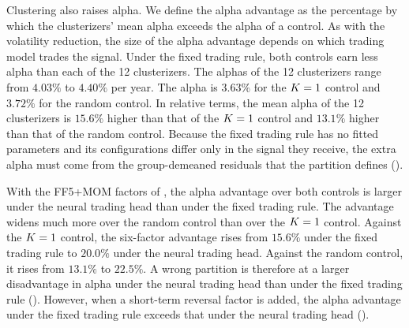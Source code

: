 

Clustering also raises alpha. We define the alpha advantage as the percentage by which the clusterizers' mean alpha exceeds the alpha of a control. As with the volatility reduction, the size of the alpha advantage depends on which trading model trades the signal. Under the fixed trading rule, both controls earn less alpha than each of the 12 clusterizers. The alphas of the 12 clusterizers range from $4.03\%$ to $4.40\%$ per year. The alpha is $3.63\%$ for the $K=1$ control and $3.72\%$ for the random control. In relative terms, the mean alpha of the 12 clusterizers is $15.6\%$ higher than that of the $K=1$ control and $13.1\%$ higher than that of the random control. Because the fixed trading rule has no fitted parameters and its configurations differ only in the signal they receive, the extra alpha must come from the group-demeaned residuals that the partition defines ().

With the FF5+MOM factors of , the alpha advantage over both controls is larger under the neural trading head than under the fixed trading rule. The advantage widens much more over the random control than over the $K=1$ control. Against the $K=1$ control, the six-factor advantage rises from $15.6\%$ under the fixed trading rule to $20.0\%$ under the neural trading head. Against the random control, it rises from $13.1\%$ to $22.5\%$. A wrong partition is therefore at a larger disadvantage in alpha under the neural trading head than under the fixed trading rule (). However, when a short-term reversal factor is added, the alpha advantage under the fixed trading rule exceeds that under the neural trading head ().

